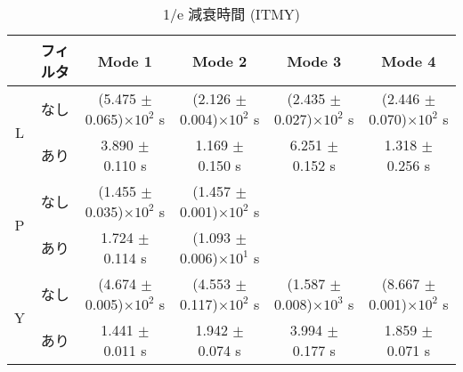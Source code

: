 \begin{table}[H]
 \centering
    \begin{tabular}{|c||c|c|c|c|c|}
   \hline
    & フィルタ & Mode 1 & Mode 2 & Mode 3 & Mode 4 \\
   \hline
   \multirow{2}{*}{L} & なし &(5.475 $\pm$ 0.065)$\times10^2$ s & (2.126 $\pm$ 0.004)$\times10^2$ s & (2.435 $\pm$ 0.027)$\times10^2$ s & (2.446 $\pm$ 0.070)$\times10^2$ s \\
   \cline{2-6}
      & あり &3.890 $\pm$ 0.110 s & 1.169 $\pm$ 0.150 s & 6.251 $\pm$ 0.152 s & 1.318 $\pm$ 0.256 s \\
   \hline\hline
   \multirow{2}{*}{P} & なし &(1.455 $\pm$ 0.035)$\times10^2$ s & (1.457 $\pm$ 0.001)$\times10^2$ s & &   \\
   \cline{2-6}
     & あり &1.724 $\pm$ 0.114 s & (1.093 $\pm$ 0.006)$\times10^{1}$ s & &  \\
   \hline\hline
   \multirow{2}{*}{Y} & なし &(4.674 $\pm$ 0.005)$\times10^2$ s & (4.553 $\pm$ 0.117)$\times10^2$ s & (1.587 $\pm$ 0.008)$\times10^3$ s & (8.667 $\pm$ 0.001)$\times10^2$ s \\
   \cline{2-6}
      & あり &1.441 $\pm$ 0.011 s & 1.942 $\pm$ 0.074 s & 3.994 $\pm$ 0.177 s & 1.859 $\pm$ 0.071 s \\
   \hline
  \end{tabular}
  \caption[1/e 減衰時間 (ITMY)]{1/e 減衰時間 (ITMY)}
   \label{table6.8}
\end{table}
